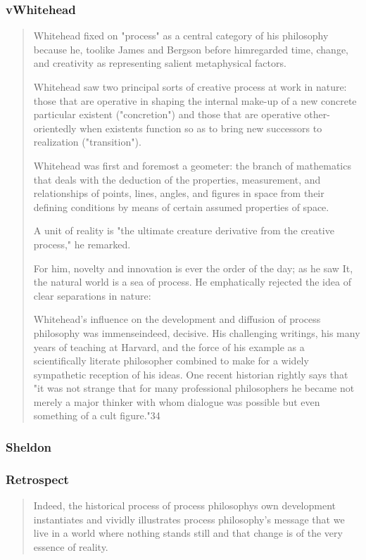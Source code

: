 \documentclass[a4paper]{Thesis}
\begin{document}
\subsubsection{vWhitehead}
\begin{quotation}
	Whitehead fixed on "process" as a central category of his philosophy
	because he, toolike James and Bergson before himregarded time, change, and creativity
	as representing salient metaphysical factors.
	
	Whitehead saw two principal sorts of creative process at work in nature: those that are
	operative in shaping the internal make-up of a new concrete particular existent
	("concretion") and those that are operative other-orientedly when existents function so as
	to bring new successors to realization ("transition").
	
	Whitehead was first and foremost a geometer:
	the branch of mathematics that deals with the deduction of the properties, measurement, and relationships of points, lines, angles, and figures in space from their defining conditions by means of certain assumed properties of space.
	
	A unit of
	reality is "the ultimate creature derivative from the creative process," he remarked.
	
	For him, novelty and innovation is ever the order of the day; as he
	saw It, the natural world is a sea of process. He emphatically rejected the idea of clear
	separations in nature:
	
	Whitehead's influence on the development and diffusion of process philosophy was
	immenseindeed, decisive. His challenging writings, his many years of teaching at
	Harvard, and the force of his example as a scientifically literate philosopher combined to
	make for a widely sympathetic reception of his ideas. One recent historian rightly says
	that "it was not strange that for many professional philosophers he became not merely a
	major thinker with whom dialogue was possible but even something of a cult figure."34	
\end{quotation}

\subsubsection{Sheldon}
\subsubsection{Retrospect}

\begin{quotation}
	Indeed, the historical process of process philosophys own development
	instantiates and vividly illustrates process philosophy's message that we live in a world
	where nothing stands still and that change is of the very essence of reality.	
\end{quotation}
\end{document}
